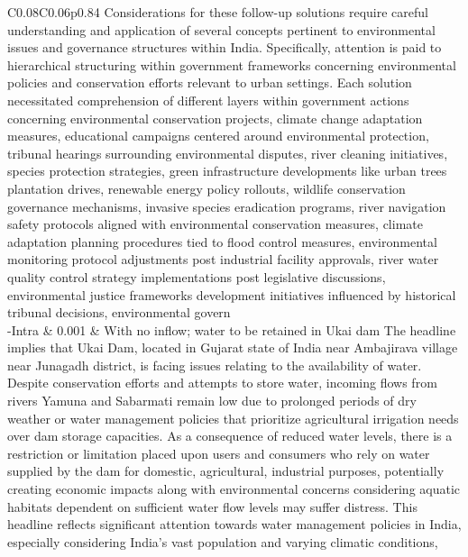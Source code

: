 \begin{table*}[!t]
{\begin{tabular}{C{0.08\textwidth}C{0.06\textwidth}p{0.84\textwidth}}
 Considerations for these follow-up solutions require careful understanding and application of several concepts pertinent to environmental issues and governance structures within India. Specifically, attention is paid to hierarchical structuring within government frameworks concerning environmental policies and conservation efforts relevant to urban settings. Each solution necessitated comprehension of different layers within government actions concerning environmental conservation projects, climate change adaptation measures, educational campaigns centered around environmental protection, tribunal hearings surrounding environmental disputes, river cleaning initiatives, species protection strategies, green infrastructure developments like urban trees plantation drives, renewable energy policy rollouts, wildlife conservation governance mechanisms, invasive species eradication programs, river navigation safety protocols aligned with environmental conservation measures, climate adaptation planning procedures tied to flood control measures, environmental monitoring protocol adjustments post industrial facility approvals, river water quality control strategy implementations post legislative discussions, environmental justice frameworks development initiatives influenced by historical tribunal decisions, environmental govern
\\ 
\midrule
\corrsynreallyshort-Intra & 0.001 &
 With no inflow; water to be retained in Ukai dam The headline implies that Ukai Dam, located in Gujarat state of India near Ambajirava village near Junagadh district, is facing issues relating to the availability of water. Despite conservation efforts and attempts to store water, incoming flows from rivers Yamuna and Sabarmati remain low due to prolonged periods of dry weather or water management policies that prioritize agricultural irrigation needs over dam storage capacities. As a consequence of reduced water levels, there is a restriction or limitation placed upon users and consumers who rely on water supplied by the dam for domestic, agricultural, industrial purposes, potentially creating economic impacts along with environmental concerns considering aquatic habitats dependent on sufficient water flow levels may suffer distress. This headline reflects significant attention towards water management policies in India, especially considering India's vast population and varying climatic conditions,


\end{tabular}}
\end{table*}
